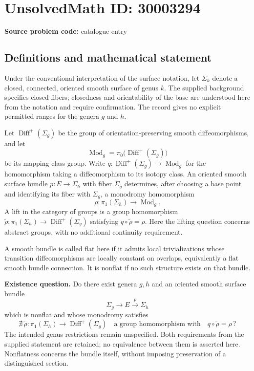 \documentclass[11pt]{article}
\begin{document}
\section*{UnsolvedMath ID: 30003294}
\textbf{Source problem code:} catalogue entry
\subsection{Definitions and mathematical statement}
Under the conventional interpretation of the surface notation, let \(\Sigma_k\) denote a closed, connected, oriented smooth surface of genus \(k\). The supplied background specifies closed fibers; closedness and orientability of the base are understood here from the notation and require confirmation. The record gives no explicit permitted ranges for the genera \(g\) and \(h\).

Let \(\operatorname{Diff}^{+}(\Sigma_g)\) be the group of orientation-preserving smooth diffeomorphisms, and let
\[
\operatorname{Mod}_g=\pi_0\bigl(\operatorname{Diff}^{+}(\Sigma_g)\bigr)
\]
be its mapping class group. Write \(q:\operatorname{Diff}^{+}(\Sigma_g)\to\operatorname{Mod}_g\) for the homomorphism taking a diffeomorphism to its isotopy class. An oriented smooth surface bundle \(p:E\to\Sigma_h\) with fiber \(\Sigma_g\) determines, after choosing a base point and identifying its fiber with \(\Sigma_g\), a monodromy homomorphism
\[
\rho:\pi_1(\Sigma_h)\longrightarrow\operatorname{Mod}_g.
\]
A lift in the category of groups is a group homomorphism \(\widetilde\rho:\pi_1(\Sigma_h)\to\operatorname{Diff}^{+}(\Sigma_g)\) satisfying \(q\circ\widetilde\rho=\rho\). Here the lifting question concerns abstract groups, with no additional continuity requirement.

A smooth bundle is called flat here if it admits local trivializations whose transition diffeomorphisms are locally constant on overlaps, equivalently a flat smooth bundle connection. It is nonflat if no such structure exists on that bundle.

\textbf{Existence question.} Do there exist genera \(g,h\) and an oriented smooth surface bundle
\[
\Sigma_g\longrightarrow E\xrightarrow{\ p\ }\Sigma_h
\]
which is nonflat and whose monodromy satisfies
\[
\nexists\,\widetilde\rho:\pi_1(\Sigma_h)\longrightarrow\operatorname{Diff}^{+}(\Sigma_g)
\quad\text{a group homomorphism with}\quad
q\circ\widetilde\rho=\rho\,?
\]
The intended genus restrictions remain unspecified. Both requirements from the supplied statement are retained; no equivalence between them is asserted here. Nonflatness concerns the bundle itself, without imposing preservation of a distinguished section.
\end{document}
